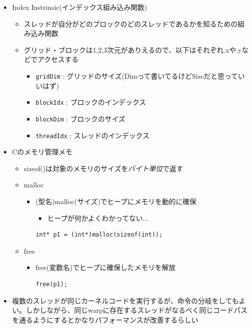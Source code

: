 \documentclass[12pt,a4paper,uplatex]{jsarticle}
\begin{document}
\begin{itemize}
\begin{itemize}
  \end{itemize}
  \item Index Instrinsic(インデックス組み込み関数)
  \begin{itemize}
    \item スレッドが自分がどのブロックのどのスレッドであるかを知るための組み込み関数
      \item グリッド・ブロックは1,2,3次元がありえるので、以下はそれぞれ.xや.yなどでアクセスする
      \begin{itemize}
        \item \lstinline|gridDim| : グリッドのサイズ(Dimって書いてるけどSizeだと思っていいはず)
        \item \lstinline|blockIdx| : ブロックのインデックス
        \item \lstinline|blockDim| : ブロックのサイズ
        \item \lstinline|threadIdx| : スレッドのインデックス
      \end{itemize}
  \end{itemize}
  \item Cのメモリ管理メモ
  \begin{itemize}
    \item sizeof()は対象のメモリのサイズを\emph{バイト単位}で返す
    \item malloc
    \begin{itemize}
      \item (型名)malloc(サイズ)でヒープにメモリを動的に確保
      \begin{itemize}
        \item ヒープが何かよくわかってない...
      \end{itemize}
      \begin{lstlisting}[caption= Dynamic memory allocation, label=dynamicMemoryAllocation]
int* p1 = (int*)malloc(sizeof(int));
      \end{lstlisting}
    \end{itemize}
    \item free
    \begin{itemize}
      \item free(変数名)でヒープに確保したメモリを解放
      \begin{lstlisting}[caption= Dynamic memory allocation, label=dynamicMemoryAllocation]
free(p1);
      \end{lstlisting}
    \end{itemize}
  \end{itemize}
  \item 複数のスレッドが同じカーネルコードを実行するが、命令の分岐をしてもよい。しかしながら、同じwarpに存在するスレッドがなるべく同じコードパスを通るようにするとかなりパフォーマンスが改善するらしい

\end{itemize}
\end{document}
